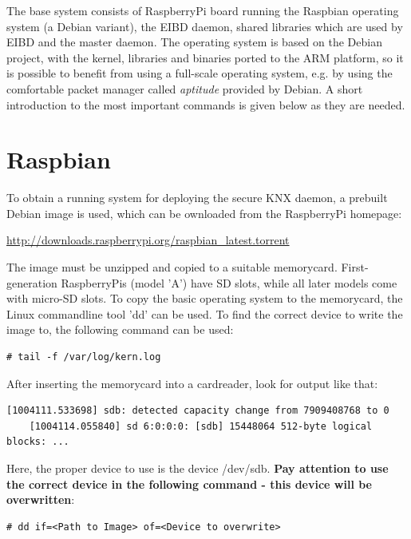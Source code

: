 The base system consists of RaspberryPi board running the Raspbian operating system (a Debian variant), the EIBD daemon, shared libraries which
are used by EIBD and the master daemon.
The operating system is based on the Debian project, with the kernel, libraries and binaries ported to the ARM platform, so it is possible to benefit from
using a full-scale operating system, e.g. by using the comfortable packet manager called
\textit{aptitude} provided by Debian. A short introduction to the most important commands is given below as they are needed.

\section{Raspbian}

To obtain a running system for deploying the secure KNX daemon, a prebuilt Debian image is used, which can be ownloaded from the RaspberryPi homepage:

\url{http://downloads.raspberrypi.org/raspbian_latest.torrent}

The image must be unzipped and copied to a suitable memorycard. First-generation RaspberryPis (model 'A') have SD slots, while
all later models come with micro-SD slots. To copy the basic operating system to the memorycard, the Linux commandline tool 'dd' can
be used. To find the correct device to write the image to, the following command can be used: 

\begin{lstlisting}[style=BashInputStyle,label=lst:kern.log]
    # tail -f /var/log/kern.log
\end{lstlisting}

After inserting the memorycard into a cardreader, look for output like that:

\begin{lstlisting}[style=BashInputStyle]
    [1004111.533698] sdb: detected capacity change from 7909408768 to 0
    [1004114.055840] sd 6:0:0:0: [sdb] 15448064 512-byte logical blocks: ...
\end{lstlisting}

Here, the proper device to use is the device /dev/sdb.
\textbf{Pay attention to use the correct device in the following command - this device will be overwritten}:

\begin{lstlisting}[style=BashInputStyle]
    # dd if=<Path to Image> of=<Device to overwrite>
\end{lstlisting}

